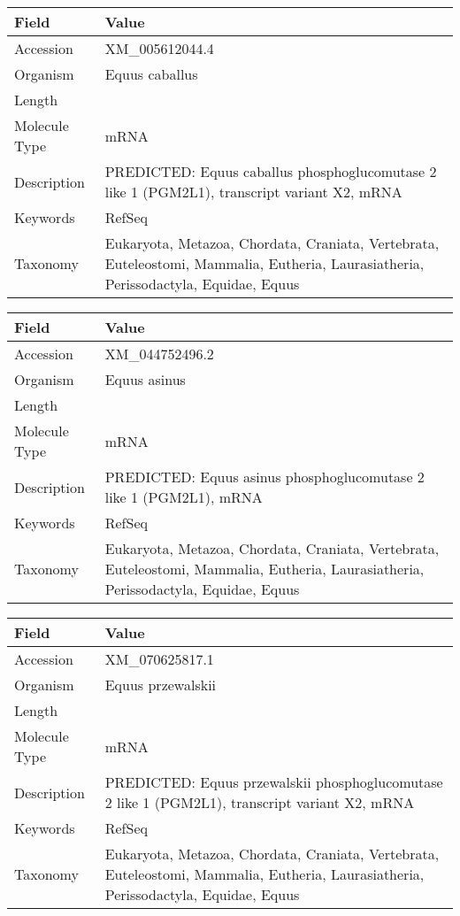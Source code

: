 \documentclass[10pt]{article}
\begin{document}
\vspace{1em}
{\footnotesize
\begin{longtable}{>{\raggedright\arraybackslash}p{4.5cm} >{\raggedright\arraybackslash}p{11.5cm}}
\textbf{Field} & \textbf{Value} \\
\hline
Accession & XM\_005612044.4 \\
Organism & Equus caballus \\
Length & 3005 \\
Molecule Type & mRNA \\
Description & PREDICTED: Equus caballus phosphoglucomutase 2 like 1 (PGM2L1), transcript variant X2, mRNA \\
Keywords & RefSeq \\
Taxonomy & Eukaryota, Metazoa, Chordata, Craniata, Vertebrata, Euteleostomi, Mammalia, Eutheria, Laurasiatheria, Perissodactyla, Equidae, Equus \\
\end{longtable}
}

\vspace{1em}
{\footnotesize
\begin{longtable}{>{\raggedright\arraybackslash}p{4.5cm} >{\raggedright\arraybackslash}p{11.5cm}}
\textbf{Field} & \textbf{Value} \\
\hline
Accession & XM\_044752496.2 \\
Organism & Equus asinus \\
Length & 3646 \\
Molecule Type & mRNA \\
Description & PREDICTED: Equus asinus phosphoglucomutase 2 like 1 (PGM2L1), mRNA \\
Keywords & RefSeq \\
Taxonomy & Eukaryota, Metazoa, Chordata, Craniata, Vertebrata, Euteleostomi, Mammalia, Eutheria, Laurasiatheria, Perissodactyla, Equidae, Equus \\
\end{longtable}
}

\vspace{1em}
{\footnotesize
\begin{longtable}{>{\raggedright\arraybackslash}p{4.5cm} >{\raggedright\arraybackslash}p{11.5cm}}
\textbf{Field} & \textbf{Value} \\
\hline
Accession & XM\_070625817.1 \\
Organism & Equus przewalskii \\
Length & 3005 \\
Molecule Type & mRNA \\
Description & PREDICTED: Equus przewalskii phosphoglucomutase 2 like 1 (PGM2L1), transcript variant X2, mRNA \\
Keywords & RefSeq \\
Taxonomy & Eukaryota, Metazoa, Chordata, Craniata, Vertebrata, Euteleostomi, Mammalia, Eutheria, Laurasiatheria, Perissodactyla, Equidae, Equus \\
\end{longtable}
}
\end{document}
